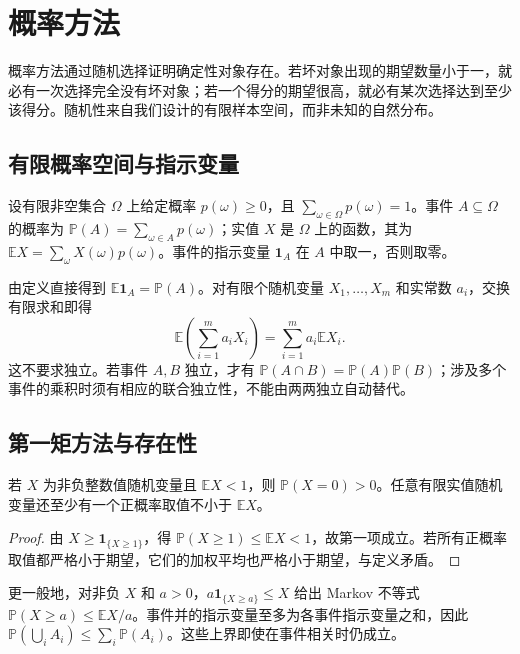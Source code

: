 \documentclass[UTF8,12pt,a4paper,fontset=fandol]{ctexbook}
\begin{document}
\chapter{概率方法}
\label{ch:probabilistic}

概率方法通过随机选择证明确定性对象存在。若坏对象出现的期望数量小于一，就必有一次选择完全没有坏对象；若一个得分的期望很高，就必有某次选择达到至少该得分。随机性来自我们设计的有限样本空间，而非未知的自然分布。

\section{有限概率空间与指示变量}

设有限非空集合 $\Omega$ 上给定概率 $p(\omega)\ge0$，且 $\sum_{\omega\in\Omega}p(\omega)=1$。事件 $A\subseteq\Omega$ 的概率为 $\mathbb P(A)=\sum_{\omega\in A}p(\omega)$；实值 $X$ 是 $\Omega$ 上的函数，其为 $\mathbb E X=\sum_\omega X(\omega)p(\omega)$。事件的指示变量 $\mathbf1_A$ 在 $A$ 中取一，否则取零。

由定义直接得到 $\mathbb E\mathbf1_A=\mathbb P(A)$。对有限个随机变量 $X_1,\ldots,X_m$ 和实常数 $a_i$，交换有限求和即得
\[
 \mathbb E\left(\sum_{i=1}^m a_iX_i\right)=\sum_{i=1}^m a_i\mathbb E X_i.
\]
这不要求独立。若事件 $A,B$ 独立，才有 $\mathbb P(A\cap B)=\mathbb P(A)\mathbb P(B)$；涉及多个事件的乘积时须有相应的联合独立性，不能由两两独立自动替代。

\section{第一矩方法与存在性}

\begin{proposition}
若 $X$ 为非负整数值随机变量且 $\mathbb E X<1$，则 $\mathbb P(X=0)>0$。任意有限实值随机变量还至少有一个正概率取值不小于 $\mathbb E X$。
\end{proposition}
\begin{proof}
由 $X\ge\mathbf1_{\{X\ge1\}}$，得 $\mathbb P(X\ge1)\le\mathbb E X<1$，故第一项成立。若所有正概率取值都严格小于期望，它们的加权平均也严格小于期望，与定义矛盾。
\end{proof}

更一般地，对非负 $X$ 和 $a>0$，$a\mathbf1_{\{X\ge a\}}\le X$ 给出 Markov 不等式 $\mathbb P(X\ge a)\le\mathbb E X/a$。事件并的指示变量至多为各事件指示变量之和，因此 $\mathbb P(\bigcup_iA_i)\le\sum_i\mathbb P(A_i)$。这些上界即使在事件相关时仍成立。
\end{document}
